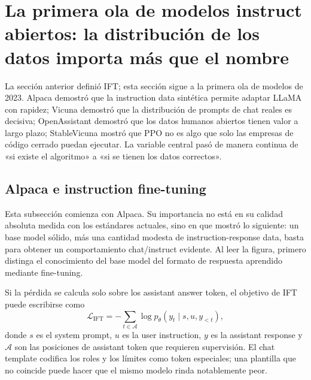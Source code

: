 \section{La primera ola de modelos instruct abiertos: la distribución de los datos importa más que el nombre}

La sección anterior definió IFT; esta sección sigue a la primera ola de modelos de 2023. Alpaca demostró que la instruction data sintética permite adaptar LLaMA con rapidez; Vicuna demostró que la distribución de prompts de chat reales es decisiva; OpenAssistant demostró que los datos humanos abiertos tienen valor a largo plazo; StableVicuna mostró que PPO no es algo que solo las empresas de código cerrado puedan ejecutar. La variable central pasó de manera continua de «si existe el algoritmo» a «si se tienen los datos correctos».

\subsection{Alpaca e instruction fine-tuning}

Esta subsección comienza con Alpaca. Su importancia no está en su calidad absoluta medida con los estándares actuales, sino en que mostró lo siguiente: un base model sólido, más una cantidad modesta de instruction-response data, basta para obtener un comportamiento chat/instruct evidente. Al leer la figura, primero distinga el conocimiento del base model del formato de respuesta aprendido mediante fine-tuning.



Si la pérdida se calcula solo sobre los assistant answer token, el objetivo de IFT puede escribirse como
\[
\mathcal{L}_{\mathrm{IFT}}=-\sum_{t\in\mathcal{A}}\log p_{\theta}(y_t\mid s,u,y_{<t}),
\]
donde $s$ es el system prompt, $u$ es la user instruction, $y$ es la assistant response y $\mathcal{A}$ son las posiciones de assistant token que requieren supervisión. El chat template codifica los roles y los límites como token especiales; una plantilla que no coincide puede hacer que el mismo modelo rinda notablemente peor.


